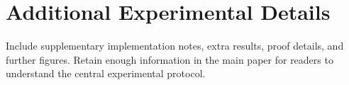\section{Additional Experimental Details}\label{app:details}
Include supplementary implementation notes, extra results, proof details, and
further figures. Retain enough information in the main paper for readers to
understand the central experimental protocol.
